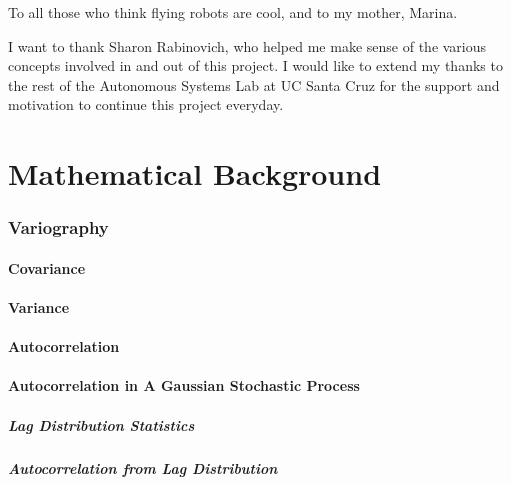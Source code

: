 \documentclass[11pt]{ucthesis}
\begin{document}
\begin{frontmatter}
\begin{dedication}
\null\vfil
{\large
\begin{center}
To all those who think flying robots are cool, and to my mother, Marina.
\vspace{12pt}
\end{center}}
\vfil\null
\end{dedication}


\begin{acknowledgements}
I want to thank Sharon Rabinovich, who helped me make sense of the various concepts involved in and out of this project. I would like to extend my thanks to the rest of the Autonomous Systems Lab at UC Santa Cruz for the support and motivation to continue this project everyday.
\end{acknowledgements}

\end{frontmatter}

\part{Mathematical Background}

\section{Variography}
\subsection{Covariance}
\subsection{Variance}
\subsection{Autocorrelation}
\subsection{Autocorrelation in A Gaussian Stochastic Process}
\subsubsection{Lag Distribution Statistics}
\subsubsection{Autocorrelation from Lag Distribution}
\end{document}
